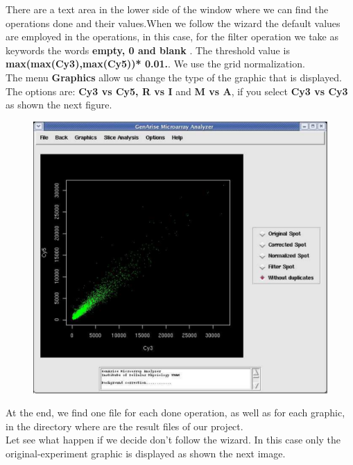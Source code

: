 \documentclass[12pt]{article}
\begin{document}
There are a text area in the lower side of the window where we can find the operations done and their values.When we follow the wizard the default values are employed in the operations, in this case, for the filter operation we take as keywords the words \textbf{empty, 0 and blank }. The threshold value is \textbf{max(max(Cy3),max(Cy5))* 0.01.}. We use the grid normalization.\\
The menu \textbf{Graphics} allow us change the type of the graphic that is displayed. The options are:  \textbf{Cy3 vs Cy5, R vs I } and \textbf{M vs A}, if you select \textbf{Cy3 vs Cy3} as shown the next figure.
\begin{figure}
\begin{center}
\includegraphics[scale= 0.3]{./images/nodupsCy3vsCy5.pdf}
\caption{}
\end{center}
\end{figure}

At the end, we find one file for each done operation, as well as for each graphic, in the directory where are the result files of our project.\\

Let see what happen if we decide don't follow the wizard. In this case only the original-experiment graphic is displayed as shown the next image.
\end{document}
